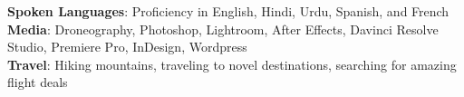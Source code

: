 % 
% 
% 
% 
% 
% 

\begin{itemize}[leftmargin=0in, label={}]
    \small{\item{
     \textbf{Spoken Languages}{: Proficiency in English, Hindi, Urdu, Spanish,
     and
     French} \\
     \textbf{Media}{: Droneography, Photoshop, Lightroom, After Effects, Davinci Resolve Studio, 
     Premiere Pro, InDesign, Wordpress} \\
    \textbf{Travel}{: Hiking mountains, traveling to novel destinations, 
    searching for amazing flight deals} \\
     
    }}
\end{itemize}
